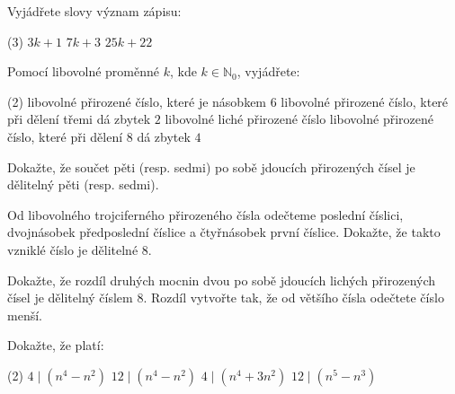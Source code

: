 \documentclass[12pt,a4paper]{article}
\begin{document}
\begin{exercise}
Vyjádřete slovy význam zápisu:
\begin{tasks}(3)
\task $3k+1$
\task $7k+3$
\task $25k+22$
\end{tasks}
\end{exercise}

\begin{exercise}
Pomocí libovolné proměnné $k$, kde $k \in \mathbb{N}_0$, vyjádřete:
\begin{tasks}(2)
\task libovolné přirozené číslo, které je násobkem $6$
\task libovolné přirozené číslo, které při dělení třemi dá zbytek $2$
\task libovolné liché přirozené číslo
\task libovolné přirozené číslo, které při dělení $8$ dá zbytek $4$
\end{tasks}
\end{exercise}

\begin{exercise}
Dokažte, že součet pěti (resp. sedmi) po sobě jdoucích přirozených čísel je dělitelný pěti (resp. sedmi).
\end{exercise}

\begin{exercise}
Od libovolného trojciferného přirozeného čísla odečteme poslední číslici, dvojnásobek předposlední číslice a čtyřnásobek první číslice.  
Dokažte, že takto vzniklé číslo je dělitelné $8$.
\end{exercise}

\begin{exercise}
Dokažte, že rozdíl druhých mocnin dvou po sobě jdoucích lichých přirozených čísel je dělitelný číslem $8$.  
Rozdíl vytvořte tak, že od většího čísla odečtete číslo menší.
\end{exercise}

\begin{exercise}
Dokažte, že platí:
\begin{tasks}(2)
\task $4 \mid (n^4 - n^2)$
\task $12 \mid (n^4 - n^2)$
\task $4 \mid (n^4 + 3n^2)$
\task $12 \mid (n^5 - n^3)$
\end{tasks}
\end{exercise}
\end{document}
